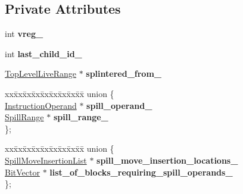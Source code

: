 \subsection*{Private Attributes}
\begin{DoxyCompactItemize}
\item 
int {\bfseries vreg\+\_\+}\hypertarget{classv8_1_1internal_1_1compiler_1_1_top_level_live_range_a70e6be33a01166a09e094499bd1253d8}{}\label{classv8_1_1internal_1_1compiler_1_1_top_level_live_range_a70e6be33a01166a09e094499bd1253d8}

\item 
int {\bfseries last\+\_\+child\+\_\+id\+\_\+}\hypertarget{classv8_1_1internal_1_1compiler_1_1_top_level_live_range_a29d6c6f3829494e19c3741db6e52865a}{}\label{classv8_1_1internal_1_1compiler_1_1_top_level_live_range_a29d6c6f3829494e19c3741db6e52865a}

\item 
\hyperlink{classv8_1_1internal_1_1compiler_1_1_top_level_live_range}{Top\+Level\+Live\+Range} $\ast$ {\bfseries splintered\+\_\+from\+\_\+}\hypertarget{classv8_1_1internal_1_1compiler_1_1_top_level_live_range_aece628c378769813c0f2cf8a67fbe788}{}\label{classv8_1_1internal_1_1compiler_1_1_top_level_live_range_aece628c378769813c0f2cf8a67fbe788}

\item 
\begin{tabbing}
xx\=xx\=xx\=xx\=xx\=xx\=xx\=xx\=xx\=\kill
union \{\\
\>\hyperlink{classv8_1_1internal_1_1compiler_1_1_instruction_operand}{InstructionOperand} $\ast$ {\bfseries spill\_operand\_}\\
\>\hyperlink{classv8_1_1internal_1_1compiler_1_1_spill_range}{SpillRange} $\ast$ {\bfseries spill\_range\_}\\
\}; \hypertarget{classv8_1_1internal_1_1compiler_1_1_top_level_live_range_a073ad43fbfb62cc59bc24217fdbd1262}{}\label{classv8_1_1internal_1_1compiler_1_1_top_level_live_range_a073ad43fbfb62cc59bc24217fdbd1262}
\\

\end{tabbing}\item 
\begin{tabbing}
xx\=xx\=xx\=xx\=xx\=xx\=xx\=xx\=xx\=\kill
union \{\\
\>\hyperlink{structv8_1_1internal_1_1compiler_1_1_top_level_live_range_1_1_spill_move_insertion_list}{SpillMoveInsertionList} $\ast$ {\bfseries spill\_move\_insertion\_locations\_}\\
\>\hyperlink{classv8_1_1internal_1_1_bit_vector}{BitVector} $\ast$ {\bfseries list\_of\_blocks\_requiring\_spill\_operands\_}\\
\}; \hypertarget{classv8_1_1internal_1_1compiler_1_1_top_level_live_range_a7e4e6924a9d2b3335e0283ddb4b9240e}{}\label{classv8_1_1internal_1_1compiler_1_1_top_level_live_range_a7e4e6924a9d2b3335e0283ddb4b9240e}
\\


\end{tabbing}
\end{DoxyCompactItemize}
